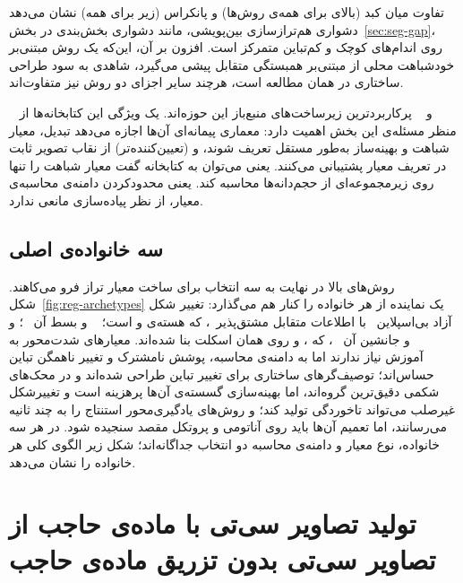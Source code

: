 تفاوت میان کبد (بالای  برای همه‌ی روش‌ها) و پانکراس (زیر  برای همه) نشان می‌دهد دشواری هم‌ترازسازی بین‌پویشی، مانند دشواری بخش‌بندی در بخش~\ref{sec:seg-gap}، روی اندام‌های کوچک و کم‌تباین متمرکز است. افزون بر آن، این‌که یک روش مبتنی‌بر خودشباهت محلی از  مبتنی‌بر همبستگی متقابل پیشی می‌گیرد، شاهدی به سود طراحی ساختاری در همان مطالعه است، هرچند سایر اجزای دو روش نیز متفاوت‌اند.

~\cite{lowekamp2013} و ~\cite{klein2010} پرکاربردترین زیرساخت‌های منبع‌باز این حوزه‌اند. یک ویژگی این کتابخانه‌ها از منظر مسئله‌ی این بخش اهمیت دارد: معماری پیمانه‌ای آن‌ها اجازه می‌دهد تبدیل، معیار شباهت و بهینه‌ساز به‌طور مستقل تعریف شوند، و (تعیین‌کننده‌تر) از نقاب تصویر ثابت در تعریف معیار پشتیبانی می‌کنند. یعنی می‌توان به کتابخانه گفت معیار شباهت را تنها روی زیرمجموعه‌ای از حجم‌دانه‌ها محاسبه کند. یعنی محدودکردن دامنه‌ی محاسبه‌ی معیار، از نظر پیاده‌سازی مانعی ندارد.

\subsection*{سه خانواده‌ی اصلی}

روش‌های بالا در نهایت به سه انتخاب برای ساخت معیار تراز فرو می‌کاهند. شکل~\ref{fig:reg-archetypes} یک نماینده از هر خانواده را کنار هم می‌گذارد: تغییر شکل آزاد بی‌اسپلاین~\cite{rueckert1999} با اطلاعات متقابل مشتق‌پذیر~\cite{mattes2001}، که هسته‌ی  و  است؛ ~\cite{heinrich2012} و بسط آن ~\cite{heinrich2013}؛ و ~\cite{balakrishnan2019} و جانشین آن ~\cite{chen2022}، که ،  و  روی همان اسکلت بنا شده‌اند. معیارهای شدت‌محور به آموزش نیاز ندارند اما به دامنه‌ی محاسبه، پوشش نامشترک و تغییر ناهمگن تباین حساس‌اند؛ توصیف‌گرهای ساختاری برای تغییر تباین طراحی شده‌اند و در محک‌های شکمی دقیق‌ترین گروه‌اند، اما بهینه‌سازی گسسته‌ی آن‌ها پرهزینه است و تغییرشکل غیرصلب می‌تواند تاخوردگی تولید کند؛ و روش‌های یادگیری‌محور استنتاج را به چند ثانیه می‌رسانند، اما تعمیم آن‌ها باید روی آناتومی و پروتکل مقصد سنجیده شود. در هر سه خانواده، نوع معیار و دامنه‌ی محاسبه دو انتخاب جداگانه‌اند؛ شکل زیر الگوی کلی هر خانواده را نشان می‌دهد.




\section{تولید تصاویر سی‌تی با ماده‌ی حاجب از تصاویر سی‌تی بدون تزریق ماده‌ی حاجب}
\label{sec:synthesis}

